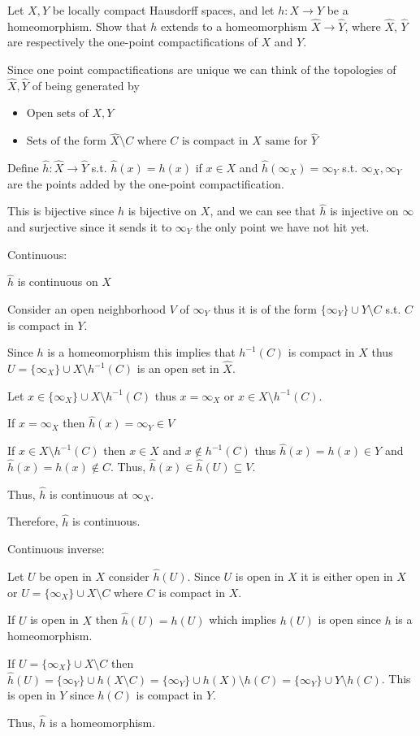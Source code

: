 \documentclass[12pt, letterpaper]{article}
\renewcommand{\t}[1]{\text{#1}}
\begin{document}
\begin{problem}{}
    Let $X, Y$ be locally compact Hausdorff spaces, and let $h:X \to Y$
  be a homeomorphism. Show that $h$ extends to a homeomorphism
  $\hat{X} \to \hat{Y}$, where $\hat{X}$, $\hat{Y}$ are respectively
  the one-point compactifications of $X$ and $Y$.
\end{problem}
\begin{problemproof}
    Since one point compactifications are unique we can think of the topologies of $\hat{X},\hat{Y}$ of being generated by
    \begin{itemize}
        \item $\t{Open sets of } X,Y$
        \item $\t{Sets of the form } \hat{X} \setminus C \t{ where } C \t{ is compact in $X$ same for $\hat{Y}$}$
    \end{itemize}

    Define $\hat{h} : \hat{X} \to \hat{Y}$ s.t. $\hat{h}(x)=h(x)$ if $x \in X$ and $\hat{h}(\infty_X)=\infty_Y$ s.t. $\infty_X,\infty_Y$ are the points added by the one-point compactification.

    This is bijective since $h$ is bijective on $X$, and we can see that $\hat{h}$ is injective on $\infty$ and surjective since it sends it to $\infty_Y$ the only point we have not hit yet.

    Continuous:

    $\hat{h}$ is continuous on $X$

    Consider an open neighborhood $V$ of $\infty_Y$ thus it is of the form $\{\infty_Y\} \cup Y \setminus C$ s.t. $C$ is compact in $Y$.

    Since $h$ is a homeomorphism this implies that $h^{-1}(C)$ is compact in $X$ thus $U=\{\infty_X\} \cup X \setminus h^{-1}(C)$ is an open set in $\hat{X}$.

    Let $x \in \{\infty_X\} \cup X \setminus h^{-1}(C)$ thus $x=\infty_X$ or $x \in X \setminus h^{-1}(C)$.

    If $x=\infty_X$ then $\hat{h}(x)=\infty_Y \in V$

    If $x \in X \setminus h^{-1}(C)$ then $x \in X$ and $x \notin h^{-1}(C)$ thus $\hat{h}(x)=h(x) \in Y$ and $\hat{h}(x)=h(x) \notin C$. Thus, $\hat{h}(x) \in \hat{h}(U) \subseteq V$.

    Thus, $\hat{h}$ is continuous at $\infty_X$.

    Therefore, $\hat{h}$ is continuous.

    Continuous inverse:

    Let $U$ be open in $X$ consider $\hat{h}(U)$. Since $U$ is open in $X$ it is either open in $X$ or $U=\{\infty_X\} \cup X \setminus C$ where $C$ is compact in $X$.

    If $U$ is open in $X$ then $\hat{h}(U)=h(U)$ which implies $h(U)$ is open since $h$ is a homeomorphism.

    If $U=\{\infty_X\} \cup X \setminus C$ then $\hat{h}(U)=\{\infty_Y\} \cup h(X \setminus C)=\{\infty_Y\} \cup h(X) \setminus h(C)=\{\infty_Y\} \cup Y \setminus h(C)$. This is open in $Y$ since $h(C)$ is compact in $Y$.

    Thus, $\hat{h}$ is a homeomorphism.
\end{problemproof}
\end{document}
